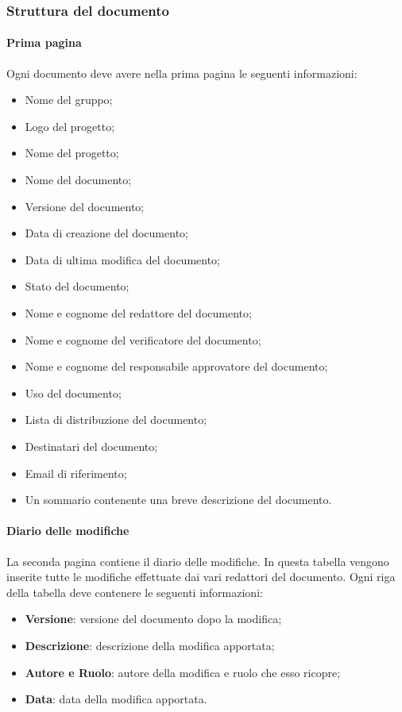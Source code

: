 \subsubsection{Struttura del documento}
\paragraph{Prima pagina}

Ogni documento deve avere nella prima pagina le seguenti informazioni:
\begin{itemize}
  \item Nome del gruppo;
  \item Logo del progetto;
  \item Nome del progetto;
  \item Nome del documento;
  \item Versione del documento;
  \item Data di creazione del documento;
  \item Data di ultima modifica del documento;
  \item Stato del documento;
  \item Nome e cognome del redattore del documento;
  \item Nome e cognome del verificatore del documento;
  \item Nome e cognome del responsabile approvatore del documento;
  \item Uso del documento;
  \item Lista di distribuzione del documento;
  \item Destinatari del documento;
  \item Email di riferimento;
  \item Un sommario contenente una breve descrizione del documento.
\end{itemize} 
\paragraph{Diario delle modifiche}
La seconda pagina contiene il diario delle modifiche. In questa tabella vengono 
inserite tutte le modifiche effettuate dai vari redattori del documento. Ogni 
riga della tabella deve contenere le seguenti informazioni:
\begin{itemize}
  \item \textbf{Versione}: versione del documento dopo la modifica;
  \item \textbf{Descrizione}: descrizione della modifica apportata;
  \item \textbf{Autore e Ruolo}: autore della modifica e ruolo che esso ricopre;
  \item \textbf{Data}: data della modifica apportata.
\end{itemize}

